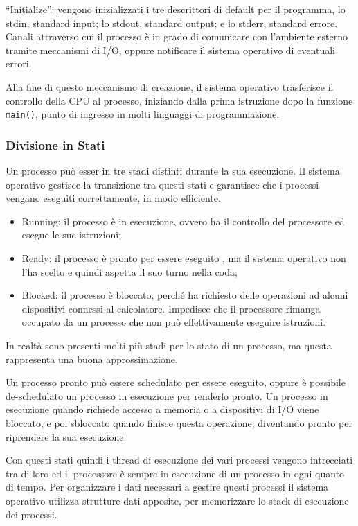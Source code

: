 \documentclass{article}
\numberwithin{equation}{subsection}
\begin{document}
``Initialize'': vengono inizializzati i tre descrittori di default per il programma, lo stdin, standard input; lo stdout, standard output; e lo stderr, standard errore. 
Canali attraverso cui il processo è in grado di comunicare con l'ambiente esterno tramite meccanismi di I/O, oppure notificare il sistema operativo di eventuali errori. 

Alla fine di questo meccanismo di creazione, il sistema operativo trasferisce il controllo della CPU al processo, iniziando dalla prima istruzione dopo la funzione 
\verb|main()|, punto di ingresso in molti linguaggi di programmazione. 

\subsubsection{Divisione in Stati}

Un processo può esser in tre stadi distinti durante la sua esecuzione. Il sistema operativo gestisce la transizione tra questi stati e garantisce che i processi 
vengano eseguiti correttamente, in modo efficiente. 
\begin{itemize}
	\item Running: il processo è in esecuzione, ovvero ha il controllo del processore ed esegue le sue istruzioni;
	\item Ready: il processo è pronto per essere eseguito , ma il sistema operativo non l'ha scelto e quindi aspetta il suo turno nella coda;
	\item Blocked: il processo è bloccato, perché ha richiesto delle operazioni ad alcuni dispositivi connessi al calcolatore. Impedisce che il processore rimanga occupato da un processo che non può effettivamente eseguire istruzioni.  	
\end{itemize}

In realtà sono presenti molti più stadi per lo stato di un processo, ma questa rappresenta una buona approssimazione. 

Un processo pronto può essere schedulato per essere eseguito, oppure è possibile de-schedulato un processo in esecuzione per renderlo pronto. Un processo in esecuzione 
quando richiede accesso a memoria o a dispositivi di I/O viene bloccato, e poi sbloccato quando finisce questa operazione, diventando pronto per riprendere la sua 
esecuzione. 


Con questi stati quindi i thread di esecuzione dei vari processi vengono intrecciati tra di loro ed il processore è sempre in esecuzione di un processo in ogni 
quanto di tempo. 
Per organizzare i dati necessari a gestire questi processi il sistema operativo utilizza strutture dati apposite, per memorizzare lo stack di esecuzione dei processi. 
\end{document}
